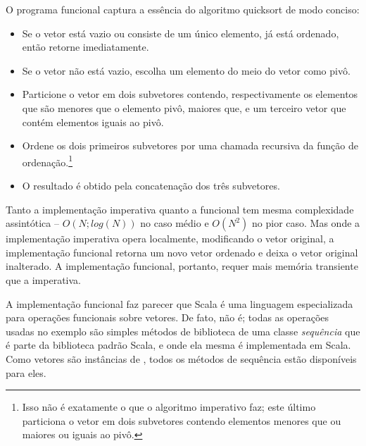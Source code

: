 O programa funcional captura a ess\^{e}ncia do algoritmo quicksort de modo conciso:
\begin{itemize}
\item Se o vetor est\'{a} vazio ou consiste de um \'{u}nico elemento, j\'{a} est\'{a} ordenado,
      ent\~{a}o retorne imediatamente.
\item Se o vetor n\~{a}o est\'{a} vazio, escolha um elemento do meio do vetor como piv\^{o}.
\item Particione o vetor em dois subvetores contendo, respectivamente os elementos
 que s\~{a}o menores que o elemento piv\^{o}, maiores que, e um terceiro vetor que cont\'{e}m
 elementos iguais ao piv\^{o}.
\item Ordene os dois primeiros subvetores por uma chamada recursiva da fun\c{c}\~{a}o de 
ordena\c{c}\~{a}o.\footnote{Isso n\~{a}o \'{e} exatamente o que o algoritmo imperativo faz; este 
\'{u}ltimo particiona o vetor em dois subvetores contendo elementos menores que ou 
maiores ou iguais ao piv\^{o}.}
\item O resultado \'{e} obtido pela concatena\c{c}\~{a}o dos tr\^{e}s subvetores.
\end{itemize}

Tanto a implementa\c{c}\~{a}o imperativa quanto a funcional tem mesma complexidade
assint\'{o}tica -- $O(N;log(N))$ no caso m\'{e}dio e $O(N^2)$ no pior caso. Mas onde
a implementa\c{c}\~{a}o imperativa opera localmente, modificando o vetor original,
a implementa\c{c}\~{a}o funcional retorna um novo vetor ordenado e deixa o vetor
original inalterado. A implementa\c{c}\~{a}o funcional, portanto, requer mais
mem\'{o}ria transiente que a imperativa.

A implementa\c{c}\~{a}o funcional faz parecer que Scala \'{e} uma linguagem
especializada para opera\c{c}\~{o}es funcionais sobre vetores. De fato, n\~{a}o \'{e};
todas as opera\c{c}\~{o}es usadas no exemplo s\~{a}o simples m\'{e}todos de biblioteca
de uma classe {\em sequ\^{e}ncia}  que \'{e} parte da biblioteca
padr\~{a}o Scala, e onde ela mesma \'{e} implementada em Scala. Como vetores s\~{a}o 
inst\^{a}ncias de \verb@Seq@, todos os m\'{e}todos de sequ\^{e}ncia est\~{a}o dispon\'{i}veis
para eles.

